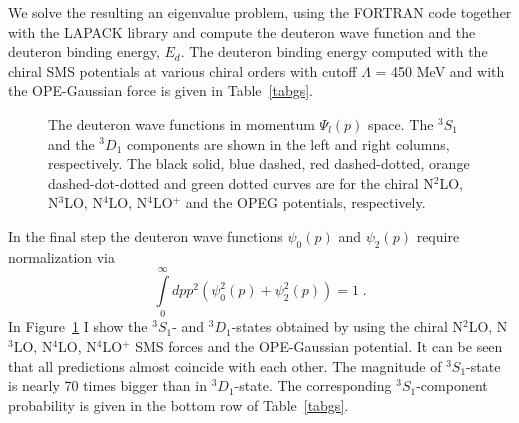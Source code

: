 We solve the resulting an eigenvalue problem, using the FORTRAN code together with the LAPACK library and compute the deuteron wave function and the deuteron binding energy, $E_{d}$. The deuteron binding energy computed with the chiral SMS potentials at various chiral orders with cutoff $\Lambda$ = 450 MeV and with the OPE-Gaussian force is given in Table~\ref{tabgs}.
\begin{figure}
\caption{The deuteron wave functions in momentum $\Psi_{l}(p)$ space. The $^{3}S_{1}$ and the $^{3}D_{1}$ components are shown in the left and right columns, respectively. The black solid, blue dashed, red dashed-dotted, orange dashed-dot-dotted and green dotted curves are for the chiral N$^{2}$LO, N$^{3}$LO, N$^{4}$LO, N$^{4}$LO$^{+}$ and the OPEG potentials, respectively.}
\label{fig:deuwf}
\end{figure}
In the final step the deuteron wave functions $\psi_{0}(p)$ and $\psi_{2}(p)$ require normalization via
\begin{equation}
\int\limits_{0}^{\infty}dp p^{2}\left(\psi^{2}_{0}(p) + \psi^{2}_{2}(p)\right) = 1\;.
\end{equation}
In Figure~\ref{fig:deuwf} I show the $^{3}S_{1}$- and $^{3}D_{1}$-states obtained by using the chiral N$^{2}$LO, N$^{3}$LO, N$^{4}$LO, N$^{4}$LO$^{+}$ SMS forces and the OPE-Gaussian potential. It can be seen that all predictions almost coincide with each other. The magnitude of $^{3}S_1$-state is nearly 70 times bigger than in $^{3}D_1$-state. The corresponding $^{3}S_1$-component probability is given in the bottom row of Table~\ref{tabgs}.

